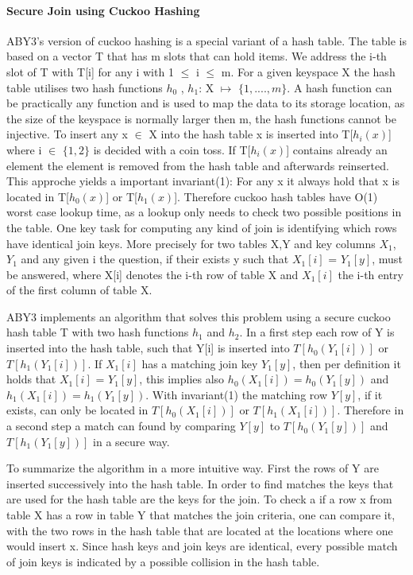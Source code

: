 \paragraph{Secure Join using Cuckoo Hashing}
ABY3's version of cuckoo hashing is a special variant of a hash table. The table is based on a vector T that has m slots that can hold items. We address the i-th slot of T with T[i] for any i with 1 $\leq$ i $ \leq $ m. For a given keyspace X the hash table utilises two hash functions $ h_0 $ , $ h_1 $: X $ \mapsto $   $ \{ 1,....,m \} $. A hash function can be practically any function and is used to map the data to its storage location, as the size of the keyspace is normally larger then m, the hash functions cannot be injective.
To insert any x $ \in $ X into the hash table x is inserted into T[$h_i(x)$] where i $ \in $ $ \{ 1,2 \} $ is decided with a coin toss. If T[$h_i(x)$] contains already an element the element is removed from the hash table and afterwards reinserted. This approche yields a important invariant(1): For any x it always hold that x is located in T[$h_0(x)$] or T[$h_1(x)$]. Therefore cuckoo hash tables have O(1) worst case lookup time, as a lookup only needs to check two possible positions in the table. 
One key task for computing any kind of join is identifying which rows have identical join keys. More precisely for two tables X,Y and key columns $X_1$, $Y_1$ and any given i the question, if their exists y such that $X_1[i]$ = $Y_1[y]$, must be answered, where X[i] denotes the i-th row of table X and $ X_1[i] $ the i-th entry of the first column of table X. 

ABY3 implements an algorithm that solves this problem using a secure cuckoo hash table T with two hash functions $ h_1 $ and $h_2$. 
In a first step each row of Y is inserted into the hash table, such that Y[i] is inserted into $ T[h_0(Y_1 [i]  )] $ or $T[h_1(Y_1 [i]  )] $. 
If $X_1[i]$ has a matching join key $Y_1[y]$, then per definition it holds that  $X_1[i]$ = $Y_1[y]$, this implies also $ h_0(X_1[i]) = h_0(Y_1[y])$ and $ h_1(X_1[i]) = h_1(Y_1[y])$. With invariant(1) the matching row $Y[y]$, if it exists, can only be located in $ T[h_0(X_1[i])] $ or $T[h_1( X_1[i])] $. 
Therefore in a second step a match can found by comparing $Y[y]$ to $ T[h_0(Y_1[y])] $ and $T[h_1(Y_1[y])] $ in a secure way. 

To summarize the algorithm in a more intuitive way. First the rows of Y are inserted successively into the hash table. In order to find matches the keys that are used for the hash table are the keys for the join. To check a if a row x from table X has a row in table Y that matches the join criteria, one can compare it, with the two rows in the hash table that are located at the locations where one would insert x. Since hash keys and join keys are identical, every possible match of join keys is indicated by a possible collision in the hash table.

